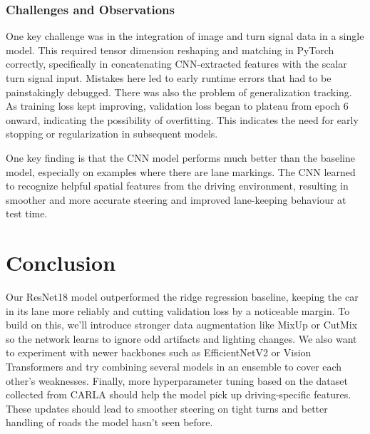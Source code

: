 \documentclass{article} %
\begin{document}
\subsubsection{Challenges and Observations}

One key challenge was in the integration of image and turn signal data in a single model. This required tensor dimension reshaping and matching in PyTorch correctly, specifically in concatenating CNN-extracted features with the scalar turn signal input. Mistakes here led to early runtime errors that had to be painstakingly debugged.
There was also the problem of generalization tracking. As training loss kept improving, validation loss began to plateau from epoch 6 onward, indicating the possibility of overfitting. This indicates the need for early stopping or regularization in subsequent models.


One key finding is that the CNN model performs much better than the baseline model, especially on examples where there are lane markings. The CNN learned to recognize helpful spatial features from the driving environment, resulting in smoother and more accurate steering and improved lane-keeping behaviour at test time. 

\section{Conclusion}

Our ResNet18 model outperformed the ridge regression baseline, keeping the car in its lane more reliably and 
cutting validation loss by a noticeable margin. To build on this, we’ll introduce stronger data augmentation like MixUp or 
CutMix so the network learns to ignore odd artifacts and lighting changes. We also want to experiment with newer backbones 
such as EfficientNetV2 or Vision Transformers and try combining several models in an ensemble to cover each other’s weaknesses. 
Finally, more hyperparameter tuning based on the dataset collected from CARLA should help the model pick up 
driving‑specific features. 
These updates should lead to smoother steering on tight turns and better handling of roads the model hasn’t seen before.
\label{last_page}
\end{document}
